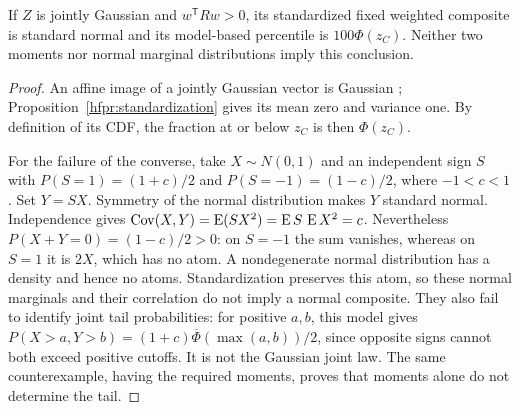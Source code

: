 \begin{proposition}
\label{hfpr:normality}
If \(Z\) is jointly Gaussian and \(w^{\mathsf T}Rw>0\), its
standardized fixed weighted composite is standard normal and its
model-based percentile is \(100\Phi(z_C)\). Neither two moments nor
normal marginal distributions imply this conclusion.
\end{proposition}
\begin{proof}
An affine image of a jointly Gaussian vector is Gaussian
\citep[Theorem 3.3.1]{gallager2013}; Proposition~\ref{hfpr:standardization}
gives its mean zero and variance one. By definition of its CDF, the fraction
at or below \(z_C\) is then \(\Phi(z_C)\).

For the failure of the converse, take \(X\sim N(0,1)\) and an independent
sign \(S\) with \(P(S=1)=(1+c)/2\) and \(P(S=-1)=(1-c)/2\),
where \(-1<c<1\). Set \(Y=SX\). Symmetry of the normal distribution
makes \(Y\) standard normal. Independence gives
\(\operatorname{Cov}(X,Y)=\operatorname{E}(SX^2)=\operatorname{E} S\,\operatorname{E} X^2=c\).
Nevertheless \(P(X+Y=0)=(1-c)/2>0\): on \(S=-1\) the sum vanishes,
whereas on \(S=1\) it is \(2X\), which has no atom. A nondegenerate
normal distribution has a density and hence no atoms. Standardization
preserves this atom, so these normal marginals and their correlation do
not imply a normal composite. They also fail to identify joint tail
probabilities: for positive \(a,b\), this model gives
\(P(X>a,Y>b)=(1+c)\overline\Phi(\max(a,b))/2\), since opposite signs
cannot both exceed positive cutoffs. It is not the Gaussian joint law.
The same counterexample, having the required moments, proves that moments
alone do not determine the tail.
\end{proof}

